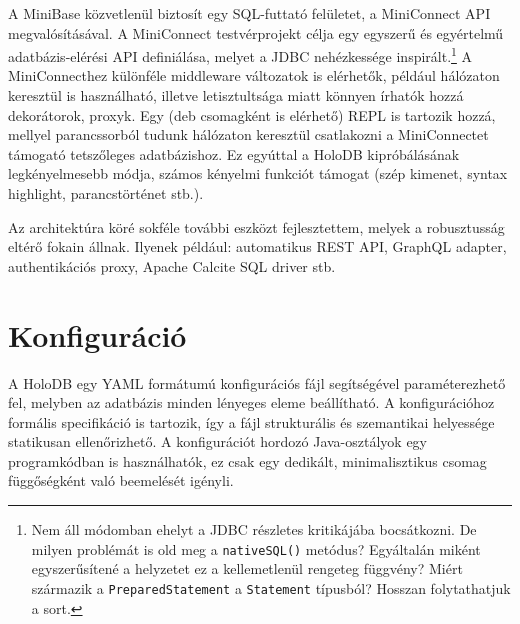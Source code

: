 \documentclass[
    parspace,
    noindent,
    nohyp,
]{elteiktdk}[2023/04/10]
\begin{document}
A MiniBase közvetlenül biztosít egy SQL-futtató felületet, a MiniConnect API megvalósításával.
A MiniConnect testvérprojekt célja egy egyszerű és egyértelmű adatbázis-elérési API definiálása,
melyet a JDBC nehézkessége inspirált.\footnote{
    Nem áll módomban ehelyt a JDBC részletes kritikájába bocsátkozni.
    De milyen problémát is old meg a \texttt{nativeSQL()} metódus?
    Egyáltalán miként egyszerűsítené a helyzetet ez a kellemetlenül rengeteg függvény?
    Miért származik a \texttt{PreparedStatement} a \texttt{Statement} típusból?
    Hosszan folytathatjuk a sort.
}
A MiniConnecthez különféle middleware változatok is elérhetők, például hálózaton keresztül is használható,
illetve letisztultsága miatt könnyen írhatók hozzá dekorátorok, proxyk.
Egy (deb csomagként is elérhető) REPL is tartozik hozzá,
mellyel parancssorból tudunk hálózaton keresztül csatlakozni a MiniConnectet támogató tetszőleges adatbázishoz.
Ez egyúttal a HoloDB kipróbálásának legkényelmesebb módja,
számos kényelmi funkciót támogat (szép kimenet, syntax highlight, parancstörténet stb.).

Az architektúra köré sokféle további eszközt fejlesztettem,
melyek a robusztusság eltérő fokain állnak.
Ilyenek például: automatikus REST API, GraphQL adapter, authentikációs proxy, Apache Calcite SQL driver stb.


\section{Konfiguráció}

A HoloDB egy YAML formátumú konfigurációs fájl segítségével paraméterezhető fel,
melyben az adatbázis minden lényeges eleme beállítható.
A konfigurációhoz formális specifikáció is tartozik,
így a fájl strukturális és szemantikai helyessége statikusan ellenőrizhető.
A konfigurációt hordozó Java-osztályok egy programkódban is használhatók,
ez csak egy dedikált, minimalisztikus csomag függőségként való beemelését igényli.
\end{document}
